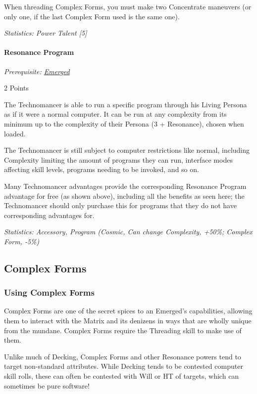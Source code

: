 \begin{multicols*}{3}
	When threading Complex Forms, you must make two Concentrate maneuvers (or only one, if the last Complex Form used is the same one).
	
	\textit{\textcolor{OliveGreen}{Statistics: Power Talent [5]}}
	
	\paragraph{Resonance Program}
	\textit{Prerequisite: \hyperref[emerged]{Emerged}}
	\begin{flushright}
		2 Points
	\end{flushright}

	The Technomancer is able to run a specific program through his Living Persona as if it were a normal computer. It can be run at any complexity from its minimum up to the complexity of their Persona (3 + Resonance), chosen when loaded.
	
	The Technomancer is still subject to computer restrictions like normal, including Complexity limiting the amount of programs they can run, interface modes affecting skill levels, programs needing to be invoked, and so on.
	
	Many Technomancer advantages provide the corresponding Resonance Program advantage for free (as shown above), including all the benefits as seen here; the Technomancer should only purchase this for programs that they do not have corresponding advantages for.

	\textit{\textcolor{OliveGreen}{Statistics: Accessory, Program (Cosmic, Can change Complexity, +50\%; Complex Form, -5\%) }}
	
	\subsection{Complex Forms}
	
	\subsubsection{Using Complex Forms}
	
	Complex Forms are one of the secret spices to an Emerged's capabilities, allowing them to interact with the Matrix and its denizens in ways that are wholly unique from the mundane. Complex Forms require the Threading skill to make use of them.
	
	Unlike much of Decking, Complex Forms and other Resonance powers tend to target non-standard attributes. While Decking tends to be contested computer skill rolls, these can often be contested with Will or HT of targets, which can sometimes be pure software! 
	

\end{multicols*}
